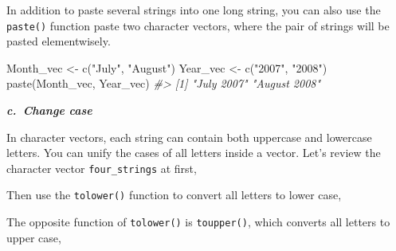 \documentclass[
]{book}
\newenvironment{Shaded}{\begin{snugshade}}{\end{snugshade}}
\newcommand{\CommentTok}[1]{\textcolor[rgb]{0.56,0.35,0.01}{\textit{#1}}}
\newcommand{\FunctionTok}[1]{\textcolor[rgb]{0.00,0.00,0.00}{#1}}
\newcommand{\NormalTok}[1]{#1}
\newcommand{\OtherTok}[1]{\textcolor[rgb]{0.56,0.35,0.01}{#1}}
\newcommand{\StringTok}[1]{\textcolor[rgb]{0.31,0.60,0.02}{#1}}
\begin{document}
In addition to paste several strings into one long string, you can also use the \texttt{paste()} function paste two character vectors, where the pair of strings will be pasted elementwisely.

\begin{Shaded}
\begin{Highlighting}[]
\NormalTok{Month\_vec }\OtherTok{\textless{}{-}} \FunctionTok{c}\NormalTok{(}\StringTok{"July"}\NormalTok{, }\StringTok{"August"}\NormalTok{)}
\NormalTok{Year\_vec }\OtherTok{\textless{}{-}} \FunctionTok{c}\NormalTok{(}\StringTok{"2007"}\NormalTok{, }\StringTok{"2008"}\NormalTok{)}
\FunctionTok{paste}\NormalTok{(Month\_vec, Year\_vec)}
\CommentTok{\#\textgreater{} [1] "July 2007"   "August 2008"}
\end{Highlighting}
\end{Shaded}

\textbf{\emph{c.~Change case}}

In character vectors, each string can contain both uppercase and lowercase letters. You can unify the cases of all letters inside a vector. Let's review the character vector \texttt{four\_strings} at first,

\begin{Shaded}
\end{Shaded}

Then use the \texttt{tolower()} function to convert all letters to lower case,

\begin{Shaded}
\end{Shaded}

The opposite function of \texttt{tolower()} is \texttt{toupper()}, which converts all letters to upper case,

\begin{Shaded}
\end{Shaded}
\end{document}
